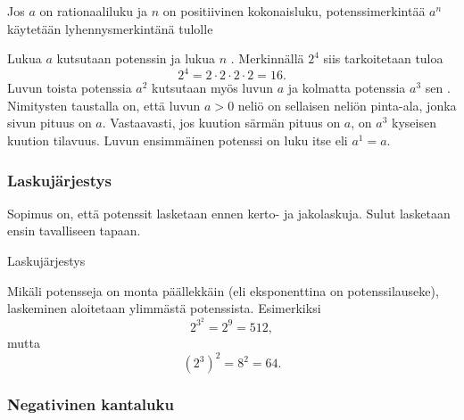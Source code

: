 Jos $a$ on rationaaliluku ja $n$ on positiivinen kokonaisluku, potenssimerkintää $a^n$ käytetään lyhennysmerkintänä tulolle
   
\laatikko{    \[
        a^n = \underbrace{a\cdot \ldots \cdot a}_{n\text{ kpl}}. 
    \]}
    
Lukua $a$ kutsutaan potenssin  ja lukua $n$ . Merkinnällä $2^4$ siis tarkoitetaan tuloa 
        \[
            2^4=2\cdot 2\cdot 2\cdot 2=16.
        \]
Luvun toista potenssia $a^2$ kutsutaan myös luvun $a$  ja kolmatta potenssia $a^3$ sen . Nimitysten taustalla on,
että luvun $a>0$ neliö on sellaisen neliön pinta-ala, jonka sivun pituus on $a$. Vastaavasti, jos kuution särmän pituus on $a$, on $a^3$ kyseisen kuution tilavuus.
Luvun ensimmäinen potenssi on luku itse eli $a^1 = a$.

\subsubsection*{Laskujärjestys}

Sopimus on, että potenssit lasketaan ennen kerto- ja jakolaskuja. Sulut lasketaan ensin tavalliseen tapaan.

    \begin{esimerkki}
      Laskujärjestys
        \begin{alakohdat}
        \end{alakohdat}
    \end{esimerkki}  

Mikäli potensseja on monta päällekkäin (eli eksponenttina on potenssilauseke),
laskeminen aloitetaan ylimmästä potenssista. Esimerkiksi
\[2^{3^2}= 2^9 = 512, \]
mutta
\[(2^3)^2=8^2=64. \]

   
%  

\subsubsection*{Negativinen kantaluku}

